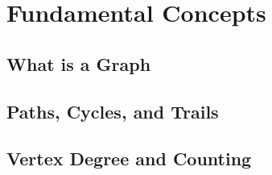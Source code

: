 \section{Fundamental Concepts}
\subsection{What is a Graph}


\subsection{Paths, Cycles, and Trails}


\subsection{Vertex Degree and Counting}